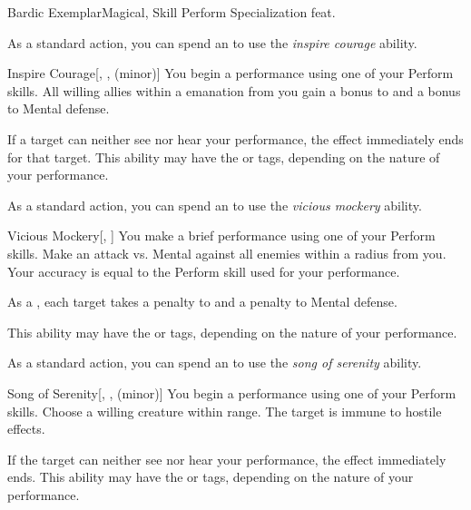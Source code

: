     \begin{feat}{Bardic Exemplar}{Magical, Skill}
        \featpre Perform Specialization feat.

         As a standard action, you can spend an  to use the \textit{inspire courage} ability.
        \begin{ability}{Inspire Courage}[, ,  (minor)]
            You begin a performance using one of your Perform skills.
            All willing allies within a \areahuge emanation from you gain a  bonus to  and a  bonus to Mental defense.

            If a target can neither see nor hear your performance, the effect immediately ends for that target.
            This ability may have the  or  tags, depending on the nature of your performance.
        \end{ability}

         As a standard action, you can spend an  to use the \textit{vicious mockery} ability.
        \begin{ability}{Vicious Mockery}[, ]
            You make a brief performance using one of your Perform skills.
            Make an attack vs. Mental against all enemies within a \areahuge radius from you.
            Your accuracy is equal to the Perform skill used for your performance.

            \hit As a , each target takes a  penalty to  and a  penalty to Mental defense.

            This ability may have the  or  tags, depending on the nature of your performance.
        \end{ability}

         As a standard action, you can spend an  to use the \textit{song of serenity} ability.
        \begin{ability}{Song of Serenity}[, ,  (minor)]
            You begin a performance using one of your Perform skills.
            Choose a willing creature within \rngmed range.
            The target is immune to hostile  effects.

            If the target can neither see nor hear your performance, the effect immediately ends.
            This ability may have the  or  tags, depending on the nature of your performance.
        \end{ability}


\end{feat}

